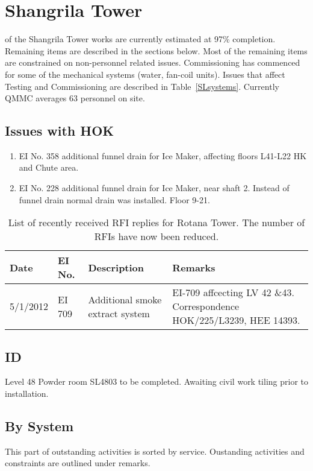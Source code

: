 \chapter{Shangrila Tower}

 of the Shangrila Tower works are currently estimated at 97\% completion. Remaining items are described in the sections below.  Most of the remaining items  are constrained on non-personnel related issues. Commissioning has commenced for some of the mechanical systems (water, fan-coil units). Issues that affect Testing and Commissioning are described in Table~\ref{SLsystems}. Currently QMMC averages 63 personnel on site. 

\section{Issues with HOK}

\begin{enumerate}
\item EI No. 358 additional funnel drain for Ice Maker, affecting floors L41-L22 HK and Chute area.
\item EI No. 228 additional funnel drain for Ice Maker, near shaft 2. Instead of funnel drain normal drain was installed. Floor 9-21.
\end{enumerate}


\begin{table}[htbp]
\small\RaggedRight
\begin{tabular}{@{}llp{3cm}p{3cm}}
\toprule
Date &EI No. &Description &Remarks\\
\midrule
5/1/2012 &EI 709  &Additional smoke extract system &EI-709 affcecting LV 42 \&43. Correspondence HOK/225/L3239, HEE 14393.\\
\bottomrule
\end{tabular}
\caption{List of recently received RFI replies for Rotana Tower. The number of RFIs have now been reduced.}
\end{table}
\section{ID}
Level 48 Powder room SL4803 to be completed. Awaiting civil work tiling prior to installation.




\section{By System}
This part of outstanding activities is sorted by service. Oustanding activities and constraints are outlined under remarks. 
\bigskip

